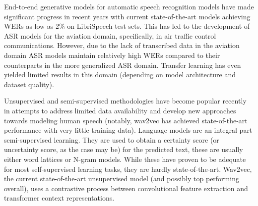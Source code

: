 \documentclass[12pt]{article}
\begin{document}
End-to-end generative models for automatic speech recognition models have made significant progress in recent years with current state-of-the-art
models achieving WERs as low as 2\% on LibriSpeech test sets\cite{han_contextnet_2020,kriman_quartznet_2020,baevski_wav2vec_2020,li_jasper_2019}.
This has led to the development of ASR models for the aviation domain, specifically, in air traffic control communications\cite{badrinath_automatic_2022,smidl_air_2019,zuluaga-gomez_automatic_2020,srinivasamurthy_semi-supervised_2017}. However, due to the lack of
transcribed data in the aviation domain\cite{zuluaga-gomez_automatic_2020,srinivasamurthy_semi-supervised_2017,badrinath_automatic_2022,smidl_air_2019}
ASR models maintain relatively high WERs compared to their counterparts in the more generalized ASR domain\cite{zuluaga-gomez_automatic_2020,badrinath_automatic_2022}. Transfer learning has even yielded limited results in this domain (depending on model
architecture and dataset quality)\cite{badrinath_automatic_2022,zuluaga-gomez_automatic_2020}.


Unsupervised and semi-supervised methodologies have become popular recently in attempts to address limited data availability
and develop new approaches towards modeling human speech (notably, wav2vec has achieved state-of-the-art performance with
very little training data)\cite{baevski_wav2vec_2020,badrinath_automatic_2022,srinivasamurthy_semi-supervised_2017,zuluaga-gomez_contextual_2021}.
Language models are an integral part semi-supervised learning. They are used to obtain a certainty score (or uncertainty
score, as the case may be) for the predicted text, these are usually either word lattices or N-gram models\cite{badrinath_automatic_2022,srinivasamurthy_semi-supervised_2017,zuluaga-gomez_contextual_2021}.
While these have proven to be adequate for most self-supervised learning tasks, they are hardly state-of-the-art.
Wav2vec, the current state-of-the-art unsupervised model (and possibly top performing overall), uses a contrastive process
between convolutional feature extraction and transformer context representations\cite{baevski_wav2vec_2020}.
\end{document}
